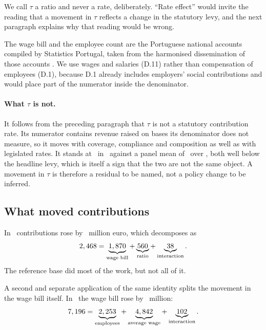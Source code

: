 We call $\tau$ a ratio and never a rate, deliberately. ``Rate effect'' would invite the
reading that a movement in $\tau$ reflects a change in the statutory levy, and the next
paragraph explains why that reading would be wrong.

The wage bill and the employee count are the Portuguese national accounts compiled by
Statistics Portugal, taken from the harmonised dissemination of those accounts
\citep{ine_wage_bill,ine_employment}. We use wages and salaries (D.11) rather than
compensation of employees (D.1), because D.1 already includes employers' social
contributions and would place part of the numerator inside the denominator.

\paragraph{What $\tau$ is not.} It follows from the preceding paragraph that $\tau$ is
not a statutory contribution rate. Its numerator contains revenue raised on bases its
denominator does not measure, so it moves with coverage, compliance and composition as
well as with legislated rates. It stands at \RatioLatest\ in \BaseYear\ against a panel
mean of \RatioMean\ over \RatioMeanWindow, both well below the headline levy, which is
itself a sign that the two are not the same object. A movement in $\tau$ is therefore a residual to be named,
not a policy change to be inferred.

\subsection{What moved contributions}



In \BaseYear\ contributions rose by \BaseContributionsChange\ million euro, which
decomposes as
\[
2,468 = \underbrace{1,870}_{\text{wage bill}}
+ \underbrace{560}_{\text{ratio}}
+ \underbrace{38}_{\text{interaction}}.
\]
The reference base did most of the work, but not all of it.

A second and separate application of the same identity splits the movement in the wage
bill itself. In \BaseYear\ the wage bill rose by \BaseWageBillChange\ million:
\[
7,196 = \underbrace{2,253}_{\text{employees}}
+ \underbrace{4,842}_{\text{average wage}}
+ \underbrace{102}_{\text{interaction}}.
\]

